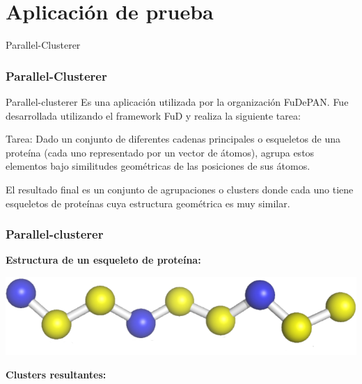 \section{Aplicación de prueba}

\begin{subsection}{Parallel-Clusterer}
\begin{frame}\frametitle{Parallel-Clusterer}

\begin{block}{Parallel-clusterer}
Es una aplicación utilizada por la organización FuDePAN. Fue desarrollada utilizando el framework FuD y realiza la siguiente tarea:
\end{block}

\pause
\vspace{2mm}
\begin{block}{Tarea:}
Dado un conjunto de diferentes cadenas principales o esqueletos de una proteína (cada uno representado por un vector de átomos), agrupa estos elementos bajo similitudes geométricas de las posiciones de sus átomos.

El resultado final es un conjunto de agrupaciones o clusters donde cada uno tiene esqueletos de proteínas cuya estructura geométrica es muy similar.
\end{block}
\end{frame}

\begin{frame}\frametitle{Parallel-clusterer}

\textbf{Estructura de un esqueleto de proteína:}
\begin{center}
	\includegraphics[scale=0.2]{images/backbone.png}
\end{center}

\textbf{Clusters resultantes:}


\end{frame}
\end{subsection}
